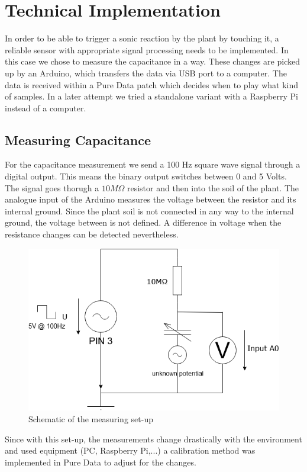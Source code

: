 \section{Technical Implementation}
In order to be able to trigger a sonic reaction by the plant by touching it, a reliable sensor with appropriate signal processing needs to be implemented. In this case we chose to measure the capacitance in a way. These changes are picked up by an Arduino, which transfers the data via USB port to a computer. The data is received within a Pure Data patch which decides when to play what kind of samples. In a later attempt we tried a standalone variant with a Raspberry Pi instead of a computer.

\subsection{Measuring Capacitance}
For the capacitance measurement we send a 100 Hz square wave signal through a digital output. This means the binary output switches between 0 and 5 Volts. The signal goes thorugh a $10 M \Omega$ resistor and then into the soil of the plant. The analogue input of the Arduino measures the voltage between the resistor and its internal ground. Since the plant soil is not connected in any way to the internal ground, the voltage between is not defined. A difference in voltage when the resistance changes can be detected nevertheless. 

\begin{figure}[H]
\begin{center}
\includegraphics[width=0.7\linewidth]{Figures/schematic1.png}
\caption{Schematic of the measuring set-up}
\end{center}
\end{figure}
Since with this set-up, the measurements change drastically with the environment and used equipment (PC, Raspberry Pi,...) a calibration method was implemented in Pure Data to adjust for the changes.


